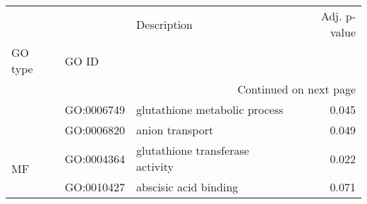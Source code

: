 \begin{longtable}{lllr}
\toprule
   &            &                       Description &  Adj. p-value \\
GO type & GO ID &                                   &               \\
\midrule
\endhead
\midrule
\multicolumn{4}{r}{{Continued on next page}} \\
\midrule
\endfoot

\bottomrule
\endlastfoot
\multirow{2}{*}{BP} & GO:0006749 &     glutathione metabolic process &         0.045 \\
   & GO:0006820 &                   anion transport &         0.049 \\
\cline{1-4}
\multirow{2}{*}{MF} & GO:0004364 &  glutathione transferase activity &         0.022 \\
   & GO:0010427 &             abscisic acid binding &         0.071 \\
\end{longtable}
